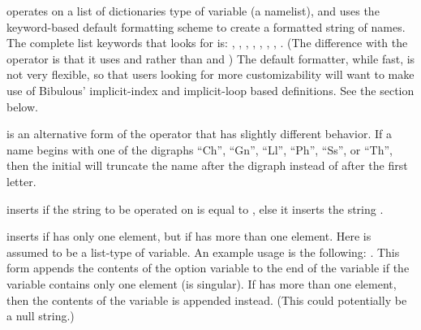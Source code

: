 \documentclass[letterpaper,10pt,english]{sphinxmanual}
\begin{document}
 operates on a list of dictionaries type of variable (a namelist), and uses the keyword-based default formatting scheme to create a formatted string of names.  The complete list keywords that looks for is: , , , , , , , . (The difference with the  operator is that it uses  and  rather than  and ) The default formatter, while fast, is not very flexible, so that users looking for more customizability will want to make use of Bibulous’ implicit-index and implicit-loop based definitions. See the  section below.

 is an alternative form of the  operator that has slightly different behavior. If a name begins with one of the digraphs “Ch”, “Gn”, “Ll”, “Ph”, “Ss”, or “Th”, then the initial will truncate the name after the digraph instead of after the first letter.

 inserts  if the string to be operated on is equal to , else it inserts the string .

 inserts  if  has only one element, but  if  has more than one element. Here  is assumed to be a list-type of variable. An example usage is the following: . This form appends the contents of the  option variable to the end of the  variable if the  variable contains only one element (is singular). If  has more than one element, then the contents of the  variable is appended instead. (This could potentially be a null string.)
\end{document}

